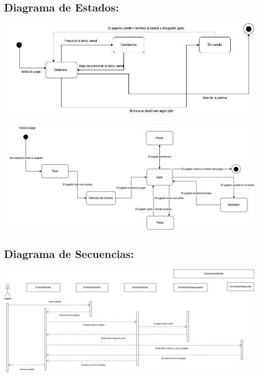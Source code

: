 \documentclass{article}
\begin{document}
\subsection*{Diagrama de Estados:}
\begin{center}
  \includegraphics[scale=0.18]{./DiagramaEstadosJugador.png}
\end{center}
\begin{center}
  \includegraphics[scale=0.18]{./DiagramaEstadosInterfaz.png}
\end{center}

\subsection*{Diagrama de Secuencias:}
\begin{center}
  \includegraphics[scale=0.18]{./DiagramaDeSecuenciaDeBatalla.png}
\end{center}
\end{document}

